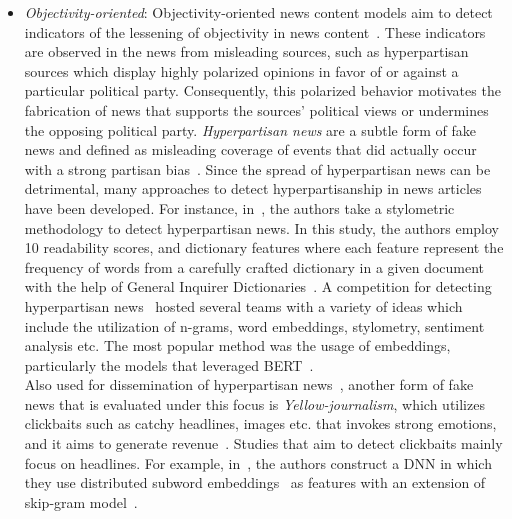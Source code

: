 \begin{description}
\begin{itemize}
        \item \emph{Objectivity-oriented}: Objectivity-oriented news content models aim to detect indicators of the lessening of objectivity in news content~\parencite{FakeNewsDetectionOnSocialMediaADataMiningPerspective_Shu}. These indicators are observed in the news from misleading sources, such as hyperpartisan sources which display highly polarized opinions in favor of or against a particular political party. Consequently, this polarized behavior motivates the fabrication of news that supports the sources’ political views or undermines the opposing political party. \emph{Hyperpartisan news} are a subtle form of fake news and  defined as misleading coverage of events that did actually occur with a strong partisan bias~\parencite{FightingMisinformationOnSocialMedia_Pennycook}. Since the spread of hyperpartisan news can be detrimental, many approaches to detect hyperpartisanship in news articles have been developed. For instance, in~\parencite{AStylometricInquiry_Potthast}, the authors take a stylometric methodology to detect hyperpartisan news. In this study, the authors employ 10 readability scores, and dictionary features where each feature represent the frequency of words from a carefully crafted dictionary in a given document with the help of General Inquirer Dictionaries~\parencite{TheGeneralInquirer_Stone}. A competition for detecting hyperpartisan news~\parencite{SemEvalHyperpartisanNewsDetection_Kiesel} hosted several teams with a variety of ideas which include the utilization of n-grams, word embeddings, stylometry, sentiment analysis etc. The most popular method was the usage of embeddings, particularly the models that leveraged BERT~\parencite{BERT_Devlin}.\\ Also used for dissemination of hyperpartisan news~\parencite{SemEvalHyperpartisanNewsDetection_Kiesel}, another form of fake news that is evaluated under this focus is \emph{Yellow-journalism}, which utilizes clickbaits such as catchy headlines, images etc. that invokes strong emotions, and it aims to generate revenue~\parencite{ClickbaitDetectionUsingDL_Agrawal, ClickbaitAndTabloidStrategies_Dolors}. Studies that aim to detect clickbaits mainly focus on headlines. For example, in~\parencite{DivingDeepIntoClickbaits_Rony}, the authors construct a DNN in which they use distributed subword embeddings~\parencite{EnrichingWordVectorsWithSubwordInfo_Bojanowski, BagOfTricksForTextClassificatoin_Joulin} as features with an extension of skip-gram model~\parencite{DistributedRepresentationsOfWords_Mikolov}.
    \end{itemize}

\end{description}
